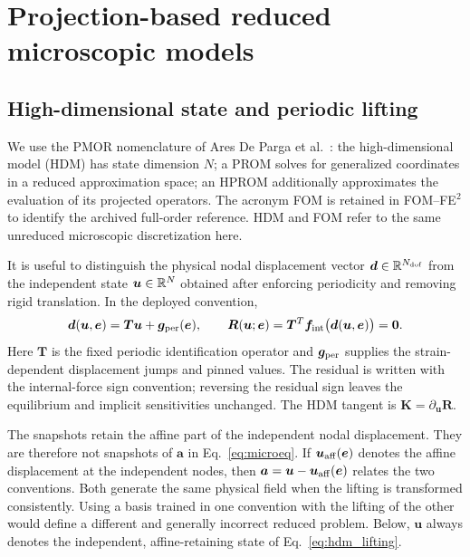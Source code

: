 \section{Projection-based reduced microscopic models}
\label{sec:reduced}
\subsection{High-dimensional state and periodic lifting}
We use the PMOR nomenclature of Ares De Parga et al.~\cite{aresdeparga2026nonlinear}: the high-dimensional model (HDM) has state dimension $N$; a PROM solves for generalized coordinates in a reduced approximation space; an HPROM additionally approximates the evaluation of its projected operators. The acronym FOM is retained in FOM--FE$^2$ to identify the archived full-order reference. HDM and FOM refer to the same unreduced microscopic discretization here.

It is useful to distinguish the physical nodal displacement vector $\bm d\in\mathbb R^{N_{\rm dof}}$ from the independent state $\bm u\in\mathbb R^N$ obtained after enforcing periodicity and removing rigid translation. In the deployed convention,
\begin{equation}
 \bm d(\bm u,\bm e)=\bm T\bm u+\bm g_{\rm per}(\bm e),
 \qquad \bm R(\bm u;\bm e)=\bm T^T\bm f_{\rm int}
                 \bigl(\bm d(\bm u,\bm e)\bigr)=\bm0.
 \label{eq:hdm_lifting}
\end{equation}
Here $\bm T$ is the fixed periodic identification operator and $\bm g_{\rm per}$ supplies the strain-dependent displacement jumps and pinned values. The residual is written with the internal-force sign convention; reversing the residual sign leaves the equilibrium and implicit sensitivities unchanged. The HDM tangent is $\bm K=\partial_{\bm u}\bm R$.

The snapshots retain the affine part of the independent nodal displacement. They are therefore not snapshots of $\bm a$ in Eq.~\eqref{eq:microeq}. If $\bm u_{\rm aff}(\bm e)$ denotes the affine displacement at the independent nodes, then $\bm a=\bm u-\bm u_{\rm aff}(\bm e)$ relates the two conventions. Both generate the same physical field when the lifting is transformed consistently. Using a basis trained in one convention with the lifting of the other would define a different and generally incorrect reduced problem. Below, $\bm u$ always denotes the independent, affine-retaining state of Eq.~\eqref{eq:hdm_lifting}.

